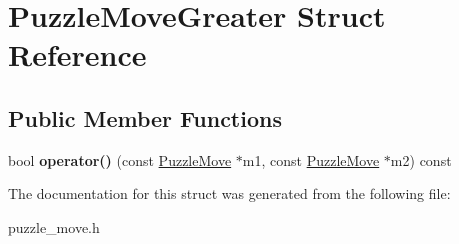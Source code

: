 \hypertarget{structPuzzleMoveGreater}{\section{\-Puzzle\-Move\-Greater \-Struct \-Reference}
\label{structPuzzleMoveGreater}
}
\subsection*{\-Public \-Member \-Functions}
\begin{DoxyCompactItemize}
\item 
\hypertarget{structPuzzleMoveGreater_a43793ecee311b7522d2f7507cca025ac}{bool {\bfseries operator()} (const \hyperlink{classPuzzleMove}{\-Puzzle\-Move} $\ast$m1, const \hyperlink{classPuzzleMove}{\-Puzzle\-Move} $\ast$m2) const }\label{structPuzzleMoveGreater_a43793ecee311b7522d2f7507cca025ac}

\end{DoxyCompactItemize}


\-The documentation for this struct was generated from the following file\-:\begin{DoxyCompactItemize}
\item 
puzzle\-\_\-move.\-h\end{DoxyCompactItemize}
